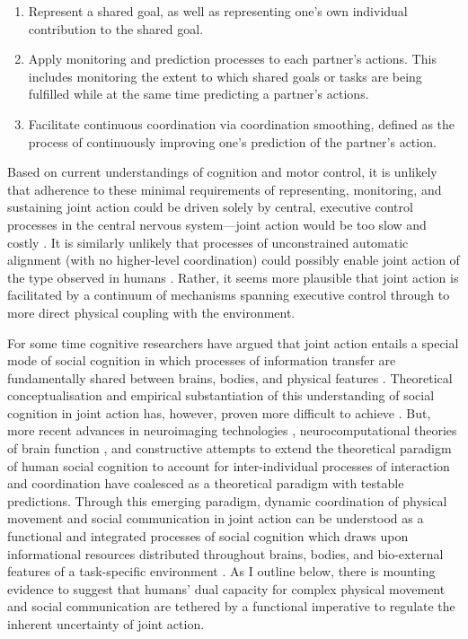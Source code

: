 \begin{CJK}{UTF8}{gbsn}
\begin{enumerate}
  \item Represent a shared goal, as well as representing one’s own individual contribution to the shared goal.
  \item Apply monitoring and prediction processes to each partner’s actions. This includes monitoring the extent to which shared goals or tasks are being fulfilled while at the same time predicting a partner’s actions.
  \item Facilitate continuous coordination via coordination smoothing, defined as the process of continuously improving one’s prediction of the partner’s action.
\end{enumerate}

Based on current understandings of cognition and motor control, it is unlikely that adherence to these minimal requirements of representing, monitoring, and sustaining joint action could be driven solely by central, executive control processes in the central nervous system---joint action would be too slow and costly \citep{Dietrich2004b}.  It is similarly unlikely that processes of unconstrained automatic alignment (with no higher-level coordination) could possibly enable joint action of the type observed in humans \citep{Fusaroli2014}.  Rather, it seems more plausible that joint action is facilitated by a continuum of mechanisms spanning executive control through to more direct physical coupling with the environment.

For some time cognitive researchers have argued that joint action entails a special mode of social cognition in which processes of information transfer are fundamentally shared between brains, bodies, and physical features \citep{Hutchins1995,Kirsh2006,Susi2001}.  Theoretical conceptualisation and empirical substantiation of this understanding of social cognition in joint action has, however, proven more difficult to achieve \citep[due in part to the tendency of the MES and CR to preference the functional role of symbolic and amodal cognitive processes; see][]{Semin2008,Yufik2013}.
But, more
recent advances in neuroimaging technologies \citep{Frith2007}, neurocomputational theories of brain function \citep{Friston2010,Frith2010,Yufik2013,Clark2013}, and constructive attempts to extend the theoretical paradigm of human social cognition to account for inter-individual processes of interaction and coordination \citep[e.g.][]{Sebanz2006,Semin2008,Dale2014} have coalesced as a theoretical paradigm with testable predictions.  Through this emerging paradigm, dynamic coordination of physical movement and social communication in joint action can be understood as a functional and integrated processes of social cognition which draws upon informational resources distributed throughout brains, bodies, and bio-external features of a task-specific environment \citep{Clark2015}.   As I outline below, there is mounting evidence to suggest that humans' dual capacity for complex physical movement and social communication are tethered by a functional imperative to regulate the inherent uncertainty of joint action.


\end{CJK}
